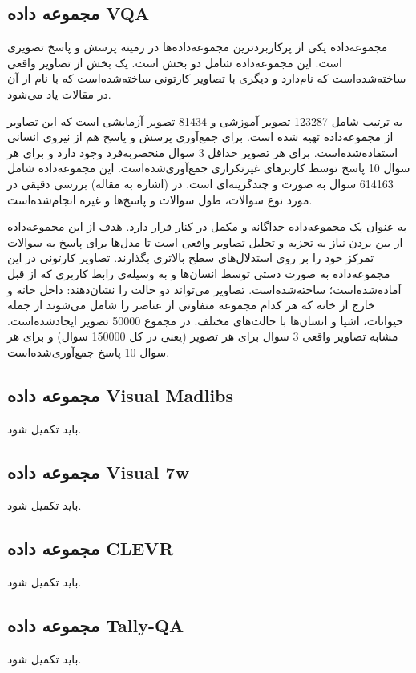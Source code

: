 \subsection{مجموعه داده VQA}
{
مجموعه‌داده
یکی از پرکاربردترین مجموعه‌داده‌ها در زمینه پرسش و پاسخ تصویری است. این مجموعه‌داده شامل دو بخش است. یک بخش از تصاویر واقعی ساخته‌شده‌است که
 نام‌دارد و دیگری با تصاویر کارتونی ساخته‌شده‌است که با نام 
 از آن در مقالات یاد می‌شود.
 
 
 به ترتیب شامل 123287 تصویر آموزشی و 81434 تصویر آزمایشی است که این تصاویر از مجموعه‌داده
  تهیه شده است.  برای جمع‌آوری پرسش و پاسخ هم از نیروی انسانی استفاده‌شده‌است. برای هر تصویر حداقل 3 سوال منحصربه‌فرد وجود دارد و برای هر سوال 10 پاسخ توسط کاربرهای غیرتکراری جمع‌آوری‌شده‌است. این مجموعه‌داده شامل 614163 سوال به صورت 
  و چندگزینه‌ای است. در (اشاره به مقاله) بررسی دقیقی در مورد نوع سوالات، طول سوالات و پاسخ‌ها و غیره انجام‌شده‌است.
  
  
 به عنوان یک مجموعه‌داده جداگانه و مکمل در کنار
 قرار دارد. هدف از این مجموعه‌داده از بین بردن نیاز به تجزیه و تحلیل تصاویر واقعی است تا مدل‌ها برای پاسخ به سوالات تمرکز خود را بر روی استدلال‌های سطح بالاتری بگذارند. تصاویر کارتونی در این مجموعه‌داده به صورت دستی توسط انسان‌ها و به وسیله‌ی رابط کاربری که از قبل آماده‌شده‌است؛ ساخته‌شده‌است. تصاویر می‌تواند دو حالت را نشان‌دهند: داخل خانه و خارج از خانه که هر کدام مجموعه متفاوتی از عناصر را شامل می‌شوند از جمله حیوانات، اشیا و انسان‌ها با حالت‌های مختلف. در مجموع 50000 تصویر ایجاد‌شده‌است. مشابه تصاویر واقعی 3 سوال برای هر تصویر (یعنی در کل 150000 سوال) و برای هر سوال 10 پاسخ  جمع‌آوری‌شده‌است. 

}

\subsection{مجموعه داده Visual Madlibs}
باید تکمیل شود.
\subsection{مجموعه داده Visual 7w}
باید تکمیل شود.
\subsection{مجموعه داده CLEVR}
باید تکمیل شود.
\subsection{مجموعه داده Tally-QA}
باید تکمیل شود.
